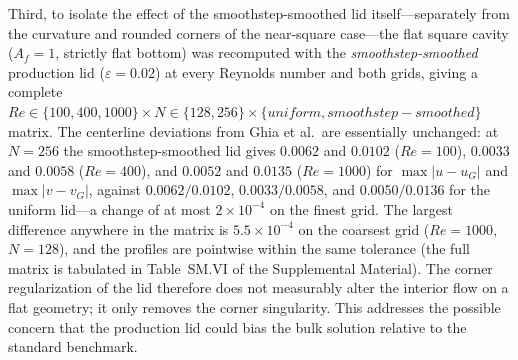 Third, to isolate the effect of the smoothstep-smoothed lid itself---separately from the curvature and rounded corners of the near-square case---the flat square cavity ($A_f=1$, strictly flat bottom) was recomputed with the \emph{smoothstep-smoothed} production lid ($\varepsilon=0.02$) at every Reynolds number and both grids, giving a complete $Re\in\{100,400,1000\}\times N\in\{128,256\}\times\{uniform, smoothstep-smoothed\}$ matrix. The centerline deviations from Ghia et al.\ are essentially unchanged: at $N=256$ the smoothstep-smoothed lid gives $0.0062$ and $0.0102$ ($Re=100$), $0.0033$ and $0.0058$ ($Re=400$), and $0.0052$ and $0.0135$ ($Re=1000$) for $\max|u-u_G|$ and $\max|v-v_G|$, against $0.0062/0.0102$, $0.0033/0.0058$, and $0.0050/0.0136$ for the uniform lid---a change of at most $2\times10^{-4}$ on the finest grid. The largest difference anywhere in the matrix is $5.5\times10^{-4}$ on the coarsest grid ($Re=1000$, $N=128$), and the profiles are pointwise within the same tolerance (the full matrix is tabulated in Table~SM.VI of the Supplemental Material). The corner regularization of the lid therefore does not measurably alter the interior flow on a flat geometry; it only removes the corner singularity. This addresses the possible concern that the production lid could bias the bulk solution relative to the standard benchmark.

